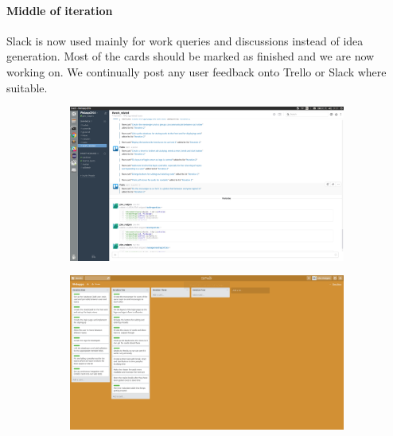 \documentclass[a4wide, 10pt]{article}
\begin{document}
\vspace{-0.3cm}
\paragraph{Middle of iteration} 
Slack is now used mainly for work queries and discussions instead of idea generation.  Most of the cards should be marked as finished and we are now working on. We continually post any user feedback onto Trello or Slack where suitable.
\begin{figure}[h]
\centering
\begin{subfigure}{.5\textwidth}
  \centering
  	\includegraphics[scale=0.1]{slackmiddle.png} 
  \label{fig:sub1}
\end{subfigure}%
\begin{subfigure}{.5\textwidth}
  \centering
  	\includegraphics[scale=0.1]{iterationmiddle.png} 
  \label{fig:sub2}
\end{subfigure}
\label{fig:test}
\end{figure}
\vspace*{-\baselineskip} 

\vspace{-0.3cm}
\end{document}
